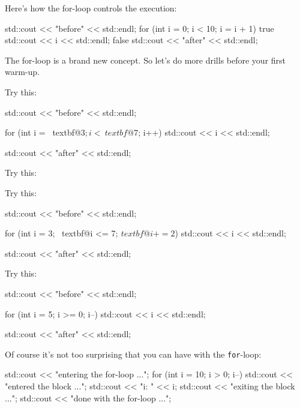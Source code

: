 Here's how the for-loop controls the execution:
\begin{console}
std::cout << "before" << std::endl;
for (int i = 0; i < 10; i = i + 1)
true
std::cout << i << std::endl;
false
std::cout << "after" << std::endl;
\end{console}


\newpage{}

The for-loop is a brand new concept. So let's do more
drills before your first warm-up.


Try this:
\begin{console}[commandchars=\~\@\$]
std::cout << "before" << std::endl;

for (int i = ~textbf@3$; i < ~textbf@7$; i++)
    std::cout << i << std::endl;

std::cout << "after" << std::endl;
\end{console}


Try this:


Try this:
\begin{console}[commandchars=\~\@\$]
std::cout << "before" << std::endl;

for (int i = 3; ~textbf@i <= 7$; ~textbf@i += 2$)
    std::cout << i << std::endl;

std::cout << "after" << std::endl;
\end{console}


Try this:
\begin{console}[commandchars=\~\@\$]
std::cout << "before" << std::endl;

for (int i = 5; i >= 0; i--)
    std::cout << i << std::endl;
    
std::cout << "after" << std::endl;
\end{console}




\newpage{}

Of course it's not too surprising that you can have  with the \texttt{for}-loop:
\begin{console}
std::cout << "entering the for-loop ...\n";
for (int i = 10; i > 0; i--)
{
        std::cout << "entered the block ...\n";
        std::cout << "i: " << i;
        std::cout << "exiting the block ...\n";
}
std::cout << "done with the for-loop ...\n";
\end{console}

